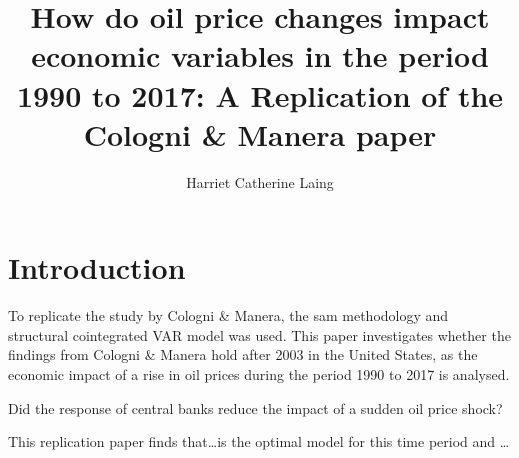 \documentclass[11pt,preprint, authoryear]{elsarticle}
\numberwithin{equation}{section}
\numberwithin{figure}{section}
\numberwithin{table}{section}
\begin{document}
\begin{frontmatter}  %

\title{How do oil price changes impact economic variables in the period
1990 to 2017: A Replication of the Cologni \& Manera paper}





\author[Add1]{Harriet Catherine Laing}





\address[Add1]{Stellenbosch University, Stellenbosch, South Africa}



\vspace{1cm}





\vspace{0.5cm}

\end{frontmatter}



\pagestyle{fancy}
\chead{}
\rhead{}
\lfoot{}
\lhead{}
\cfoot{}


\headsep 35pt %




\hypertarget{introduction}{%
\section{\texorpdfstring{Introduction
\label{Introduction}}{Introduction }}\label{introduction}}

To replicate the study by Cologni \& Manera, the sam methodology and
structural cointegrated VAR model was used. This paper investigates
whether the findings from Cologni \& Manera hold after 2003 in the
United States, as the economic impact of a rise in oil prices during the
period 1990 to 2017 is analysed.

Did the response of central banks reduce the impact of a sudden oil
price shock?

This replication paper finds that\ldots is the optimal model for this
time period and \ldots{}
\end{document}
